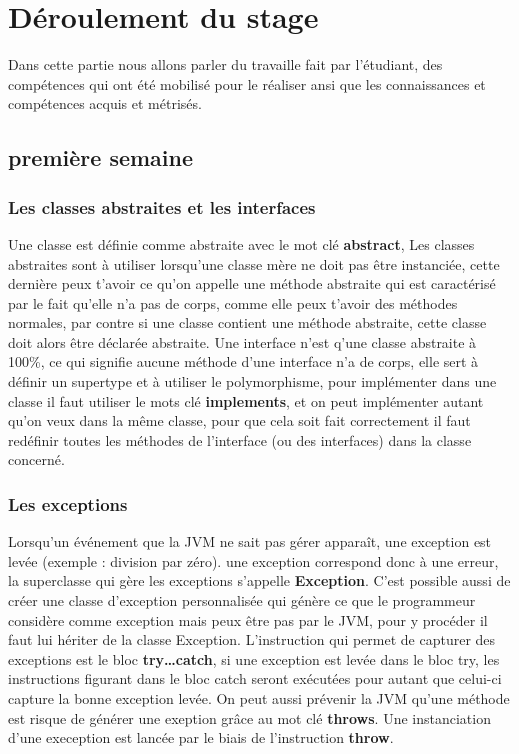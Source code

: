 \documentclass[12pt]{report}
\begin{document}
\newpage
\section{Déroulement du stage}

Dans cette partie nous allons parler du travaille fait par l'étudiant, des compétences qui ont été mobilisé pour le réaliser ansi que les connaissances et compétences acquis et métrisés.

\subsection{première semaine}

\subsubsection{Les classes abstraites et les interfaces}

Une classe est définie comme abstraite avec le mot clé \textbf{abstract}, Les classes abstraites sont à utiliser lorsqu'une classe mère ne doit pas être instanciée, cette dernière peux t'avoir ce qu'on appelle une méthode abstraite qui est caractérisé par le fait qu'elle n'a pas de corps, comme elle peux t'avoir des méthodes normales, par contre si une classe contient une méthode abstraite, cette classe doit alors être déclarée abstraite.\newline
Une interface n'est q'une classe abstraite à 100\%, ce qui signifie aucune méthode d'une interface n'a de corps, elle sert à définir un supertype et à utiliser le polymorphisme, pour implémenter dans une classe il faut utiliser le mots clé \textbf{implements}, et on peut implémenter autant qu'on veux dans la même classe, pour que cela soit fait correctement il faut redéfinir toutes les méthodes de l'interface (ou des interfaces) dans la classe concerné.

\subsubsection{Les exceptions}
Lorsqu'un événement que la JVM ne sait pas gérer apparaît, une exception est levée (exemple : division par zéro). une exception correspond donc à une erreur, la superclasse qui gère les exceptions s'appelle \textbf{Exception}. C'est possible aussi de créer une classe d'exception personnalisée qui génère ce que le programmeur considère comme exception mais peux être pas par le JVM, pour y procéder il faut lui hériter de la classe Exception.\newline
L'instruction qui permet de capturer des exceptions est le bloc \textbf{try{…}catch{}}, si une exception est levée dans le bloc try, les instructions figurant dans le bloc catch seront exécutées pour autant que celui-ci capture la bonne exception levée. On peut aussi prévenir la JVM qu'une méthode est risque de générer une exeption grâce au mot clé \textbf{throws}. Une instanciation d'une exeception est lancée par le biais de l'instruction \textbf{throw}.
\end{document}
